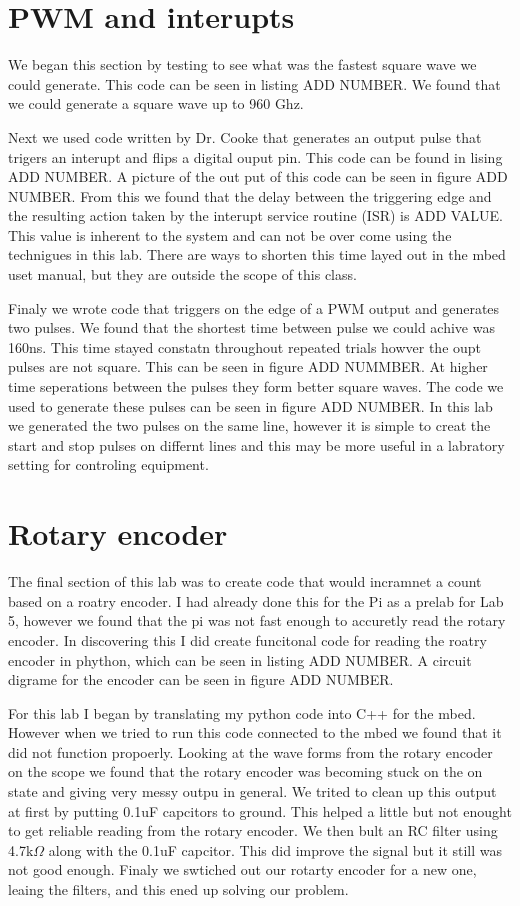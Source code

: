 \documentclass[prl,12pt,notitlepage,aps,onecolumn,superscriptaddress]{revtex4-1}
\newcommand{\ohm}{$\Omega$ }
\begin{document}
\section{PWM and interupts}
We began this section by testing to see what was the fastest square wave we could generate. This code can be seen in listing ADD NUMBER. We found that we could generate a square wave up to 960 Ghz.

Next we used code written by Dr. Cooke that generates an output pulse that trigers an interupt and flips a digital ouput pin. This code can be found in lising ADD NUMBER. A picture of the out put of this code can be seen in figure ADD NUMBER. From this we found that the delay between the triggering edge and the resulting action taken by the interupt service routine (ISR) is ADD VALUE. This value is inherent to the system and can not be over come using the technigues in this lab. There are ways to shorten this time layed out in the mbed uset manual, but they are outside the scope of this class. 

Finaly we wrote code that triggers on the edge of a PWM output and generates two pulses. We found that the shortest time between pulse we could achive was 160ns. This time stayed constatn throughout repeated trials howver the oupt pulses are not square. This can be seen in figure ADD NUMMBER. At higher time seperations between the pulses they form better square waves. The code we used to generate these pulses can be seen in figure ADD NUMBER. In this lab we generated the two pulses on the same line, however it is simple to creat the start and stop pulses on differnt lines and this may be more useful in a labratory setting for controling equipment.

\section{Rotary encoder}
The final section of this lab was to create code that would incramnet a count based on a roatry encoder. I had already done this for the Pi as a prelab for Lab 5, however we found that the pi was not fast enough to accuretly read the rotary encoder. In discovering this I did create funcitonal code for reading the roatry encoder in phython, which can be seen in listing ADD NUMBER. A circuit digrame for the encoder can be seen in figure ADD NUMBER.

For this lab I began by translating my python code into C++ for the mbed. However when we tried to run this code connected to the mbed we found that it did not function propoerly. Looking at the wave forms from the rotary encoder on the scope we found that the rotary encoder was becoming stuck on the on state and giving very messy outpu in general. We trited to clean up this output at first by putting 0.1uF capcitors to ground. This helped a little but not enought to get reliable reading from the rotary encoder. We then bult an RC filter using 4.7k\ohm along with the 0.1uF capcitor. This did improve the signal but it still was not good enough. Finaly we swtiched out our rotarty encoder for a new one, leaing the filters, and this ened up solving our problem.
\end{document}
